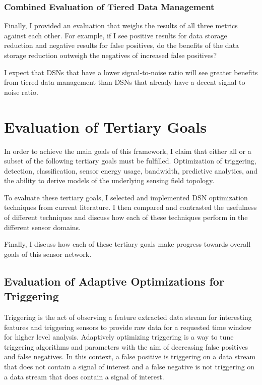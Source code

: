 \subsubsection{Combined Evaluation of Tiered Data Management}
Finally, I provided an evaluation that weighs the results of all three metrics against each other. For example, if I see positive results for data storage reduction and negative results for false positives, do the benefits of the data storage reduction outweigh the negatives of increased false positives?

I expect that DSNs that have a lower signal-to-noise ratio will see greater benefits from tiered data management than DSNs that already have a decent signal-to-noise ratio.

\section{Evaluation of Tertiary Goals}\label{sec:evaluation-of-tertiary-goals}
In order to achieve the main goals of this framework, I claim that either all or a subset of the following tertiary goals must be fulfilled. Optimization of triggering, detection, classification, sensor energy usage, bandwidth, predictive analytics, and the ability to derive models of the underlying sensing field topology.

To evaluate these tertiary goals, I selected and implemented DSN optimization techniques from current literature. I then compared and contrasted the usefulness of different techniques and discuss how each of these techniques perform in the different sensor domains.

Finally, I discuss how each of these tertiary goals make progress towards overall goals of this sensor network.

\subsection{Evaluation of Adaptive Optimizations for Triggering}\label{subsec:evaluation-of-adaptive-optimizations-for-triggering}
Triggering is the act of observing a feature extracted data stream for interesting features and triggering sensors to provide raw data for a requested time window for higher level analysis. Adaptively optimizing triggering is a way to tune triggering algorithms and parameters with the aim of decreasing false positives and false negatives. In this context, a false positive is triggering on a data stream that does not contain a signal of interest and a false negative is not triggering on a data stream that does contain a signal of interest.

